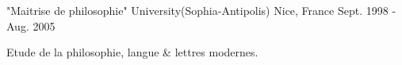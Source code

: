 

\begin{cventries}

  \cventry
    {"Maitrise de philosophie"} %
    {University(Sophia-Antipolis)} %
    {Nice, France} %
    {Sept. 1998 - Aug. 2005} %
    {
      \begin{cvitems} %
        \item {Etude de la philosophie, langue \& lettres modernes.}
      \end{cvitems}
    }

\end{cventries}
